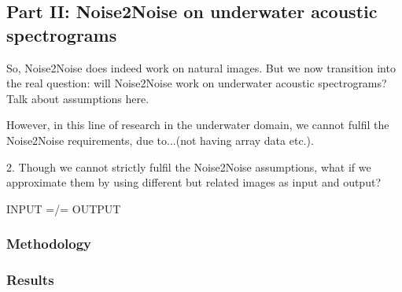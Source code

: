 
\subsection{Part II: Noise2Noise on underwater acoustic spectrograms}

So, Noise2Noise does indeed work on natural images. But we now transition into the real question: will Noise2Noise work on underwater acoustic spectrograms? Talk about assumptions here.

However, in this line of research in the underwater domain, we cannot fulfil the Noise2Noise requirements, due to...(not having array data etc.). 

2. Though we cannot strictly fulfil the Noise2Noise assumptions, what if we approximate them by using different but related images as input and output?

INPUT =/= OUTPUT

\subsubsection{Methodology}
\subsubsection{Results}
